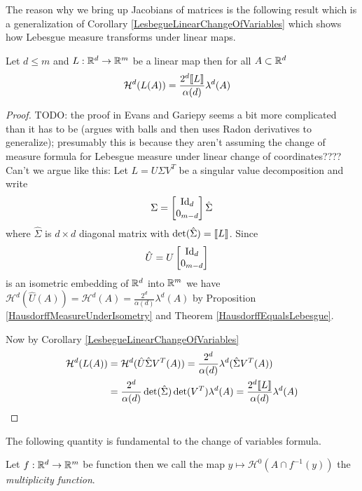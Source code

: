 The reason why we bring up Jacobians of matrices is the following result which is a generalization of Corollary \ref{LesbegueLinearChangeOfVariables}
which shows how Lebesgue measure transforms under linear maps.
\begin{lem}Let $d \leq m$ and $L : \mathbb{R}^d \to \mathbb{R}^m$ be a linear map then for all $A \subset \mathbb{R}^d$
\begin{align*}
\mathcal{H}^d(L(A)) &= \frac{2^d \llbracket L \rrbracket }{\alpha(d)} \lambda^d(A)
\end{align*}
\end{lem}
\begin{proof}
TODO: the proof in Evans and Gariepy seems a bit more complicated than it has to be (argues with balls and then uses Radon derivatives to generalize); presumably this is because they aren't assuming the change of measure formula for Lebesgue measure under linear change of coordinates????  Can't we argue like this:
Let $L = U \Sigma V^T$ be a singular value decomposition and write 
\begin{align*}
\Sigma = \begin{bmatrix}
\operatorname*{Id}_d \\
0_{m-d}
\end{bmatrix}
\hat{\Sigma}
\end{align*}
where $\hat{\Sigma}$ is $d \times d$ diagonal matrix with $\det(\hat{\Sigma}) = \llbracket L \rrbracket$.  Since 
\begin{align*}
\hat{U} &=  U \begin{bmatrix}
\operatorname*{Id}_d \\
0_{m-d}
\end{bmatrix}
\end{align*}
is an isometric embedding of $\mathbb{R}^d$ into $\mathbb{R}^m$ we have $\mathcal{H}^d(\hat{U}(A)) =\mathcal{H}^d(A)  = \frac{2^d}{\alpha(d)} \lambda^d(A)$
by Proposition \ref{HausdorffMeasureUnderIsometry} and Theorem \ref{HausdorffEqualsLebesgue}.

Now by Corollary \ref{LesbegueLinearChangeOfVariables}
\begin{align*}
\mathcal{H}^d(L(A)) &= \mathcal{H}^d(\hat{U} \hat{\Sigma} V^T(A)) = \frac{2^d}{\alpha(d)} \lambda^d(\hat{\Sigma} V^T(A)) \\
&= \frac{2^d}{\alpha(d)} \det(\hat{\Sigma}) \det(V^T) \lambda^d(A) = \frac{2^d \llbracket L \rrbracket }{\alpha(d)} \lambda^d(A)
\end{align*}
\end{proof}

The following quantity is fundamental to the change of variables formula.
\begin{defn}Let $f : \mathbb{R}^d \to \mathbb{R}^m$ be function then we call the map $y \mapsto \mathcal{H}^0( A \cap f^{-1} (y))$ the \emph{multiplicity function}.
\end{defn}

